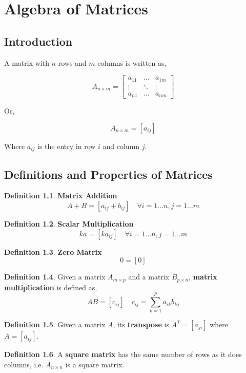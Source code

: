 \documentclass{report}
\theoremstyle{definition}
\newtheorem*{_def}{Definition}
\theoremstyle{remark}
\begin{document}
\chapter{Algebra of Matrices}

\section{Introduction}

A matrix with $n$ rows and $m$ columns is written as,

\[A_{n\times m}=
\begin{bmatrix}
    a_{11} & \dots  & a_{1m} \\
    \vdots & \ddots & \vdots \\
    a_{n1} & \dots  & a_{nm}
\end{bmatrix}
\]

Or,

\[A_{n\times m}=[a_{ij}]\]

Where $a_{ij}$ is the entry in row $i$ and column $j$.

\section{Definitions and Properties of Matrices}

\begin{_def}
\textbf{Matrix Addition}
\[A+B=[a_{ij}+b_{ij}] \quad \forall i=1...n, j=1...m\]
\end{_def}

\begin{_def}
\textbf{Scalar Multiplication}
\[ka=[ka_{ij}] \quad \forall i=1...n, j=1...m\]
\end{_def}

\begin{_def}
\textbf{Zero Matrix}
\[0=[0]\]
\end{_def}

\begin{_def}
Given a matrix $A_{m\times p}$ and a matrix $B_{p\times n}$, \textbf{matrix multiplication} is defined as,
\[AB=[c_{ij}] \quad c_{ij}=\sum\limits_{k=1}^p a_{ik}b_{kj}\]
\end{_def}

\begin{_def}
Given a matrix $A$, its \textbf{transpose} is $A^T=[a_{ji}]$ where $A=[a_{ij}]$.
\end{_def}

\begin{_def}
A \textbf{square matrix} has the same number of rows as it does columns, i.e. $A_{n\times n}$ is a square matrix.
\end{_def}
\end{document}
